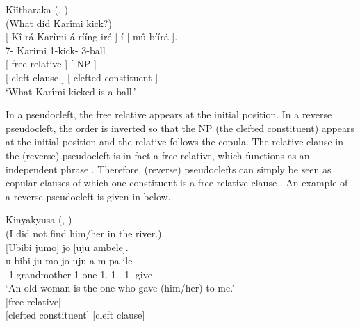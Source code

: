 \documentclass[output=paper]{langscibook}
\begin{document}
\ea
\label{bkm:Ref122688149}
Kîîtharaka (, \cite{chapters/kiitharaka})\\
(What did Karîmi kick?)\\
\gllll {}[ Kî-rá  Karîmi  á-rííng-iré ] í  [ mû-bíírá ]. \\
{} 7-\RM{}  Karimi  1\SM{}-kick-\PFV{} {}  \COP{} {}  3-ball {}\\
{}[ {} free relative  ]  \COP{}  [ NP ]\\
{}[ {} cleft clause  ]  \COP{}  [ {clefted constituent} ]\\
\glt
‘What Karîmi kicked is a ball.’\\

\z

In a pseudocleft, the free relative appears at the initial position. In a reverse pseudocleft, the order is inverted so that the NP (the clefted constituent) appears at the initial position and the relative follows the copula. The relative clause in the (reverse) pseudocleft is in fact a free relative, which functions as an independent phrase \citep[see e.g.][]{Šimík2018}. Therefore, (reverse) pseudoclefts can simply be seen as copular clauses of which one constituent is a free relative clause \citep{DenDikken2006}. An example of a reverse pseudocleft is given in  below.

\ea
\label{bkm:Ref134538120}
Kinyakyusa (, \cite{chapters/kinyakyusa})\\
(I did not find him/her in the river.)\\
{}[Ubibi jumo] jo [uju ambele].\\
\gll
u-bibi  ju-mo  jo  uju  a-m-pa-ile\\
\AUG{}-1.grandmother  1-one  1.\IDCOP{}  1.\DEM.\PROX{}  1\SG.\OM{}-give-\PFV{}\\
\glt
‘An old woman is the one who gave (him/her) to me.’\\

\gll {[NP] {} {}}               \COP{}   {[free relative]}\\
{[clefted constituent] {}}   \COP{}    {[cleft clause]}\\
\z
\end{document}
